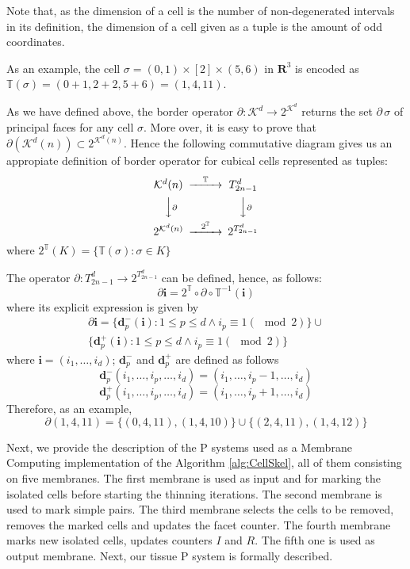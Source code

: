 \documentclass[journal]{IEEEtran}
\begin{document}
Note that, as the dimension of a cell is the number of non-degenerated intervals in its definition, 
the dimension of a cell given as a tuple is the amount of odd coordinates.

As an example, the cell $\sigma=(0,1) \times [2] \times (5,6)$ in $\mathbf{R}^3$ is encoded as
$\mathbb{T}(\sigma) = (0+1, 2+2, 5+6)= (1, 4, 11)$.

As we have defined above, the border operator $\partial: \mathcal{K}^d \rightarrow 2^{\mathcal{K}^d}$ 
returns the set $\partial\, \sigma$ of principal faces for any cell $\sigma$. More over, it is easy to prove
that $\partial (\mathcal{K}^d(n)) \subset 2^{\mathcal{K}^d(n)}$. Hence the following commutative diagram
gives us an appropiate definition of border operator for cubical cells represented as tuples:
$$
\begin{CD}
\mathcal{K}^d (n) 	@>\mathbb{T}>> 	T_{2n-1}^d \\
@VV{\partial}V						@VV{\partial}V\\
2^{\mathcal{K}^d(n)} @>2^\mathbb{T}>> 2^{T_{2n-1}^d}
\end{CD}
$$
where $2^\mathbb{T}(K)=\{\mathbb{T}(\sigma): \sigma \in K\}$

The operator $\partial: T_{2n-1}^d \rightarrow 2^{T_{2n-1}^d}$ can be defined, hence, as follows:
$$
\partial \mathbf{i} = 2^\mathbb{T} \circ \partial \circ \mathbb{T}^{-1} (\mathbf{i})
$$
where its explicit expression is given by
\begin{eqnarray*}
\partial \mathbf{i} = 
\{\mathbf{d}^-_p(\mathbf{i}):1 \leq p \leq d \wedge i_p \equiv 1 (\mod 2)\} \cup\\ 
\{\mathbf{d}^+_p(\mathbf{i}):1 \leq p \leq d \wedge i_p \equiv 1 (\mod 2)\}
\end{eqnarray*}
where $\mathbf{i} = (i_1, \ldots, i_d)$; $\mathbf{d}^-_p$ and $\mathbf{d}^+_p$ are defined as follows
$$
\mathbf{d}^-_p(i_1, \ldots, i_p, \ldots, i_d) = (i_1, \ldots, i_p-1, \ldots, i_d)
$$
$$
\mathbf{d}^+_p(i_1, \ldots, i_p, \ldots, i_d) = (i_1, \ldots, i_p+1, \ldots, i_d)
$$
Therefore, as an example, 
$$
\partial (1,4,11) = \{(0,4,11), (1,4,10)\} \cup \{(2,4,11), (1,4,12)\}
$$

Next, we provide the description of the P systems used as a Membrane
Computing implementation of the Algorithm \ref{alg:CellSkel}, all of them 
consisting on five membranes. The first membrane is used as input and for 
marking the isolated cells before starting the thinning iterations. The second 
membrane is used to mark simple pairs. The third membrane selects the cells
to be removed, removes the marked cells and updates the facet
counter. The fourth membrane marks new isolated cells, updates
counters $I$ and $R$. The fifth one is used as output membrane.
Next, our tissue P system is formally described.
\end{document}
